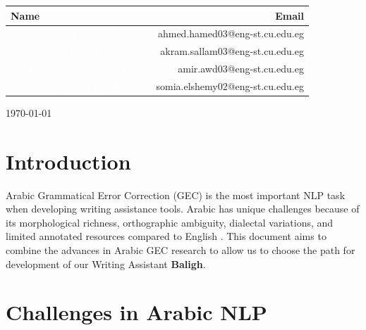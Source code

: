 \documentclass{article}
\begin{document}
\begin{titlepage}
\begin{center}
    \begin{tcolorbox}[mainbox, title=\textcolor{white}{Team Contact Information}, sharp corners=north, sharp corners=south]
        \renewcommand{\arraystretch}{1.2}
        \begin{tabularx}{\textwidth}{Xr}
            \textbf{\textcolor{accentgold}{Name}} & \textbf{\textcolor{accentgold}{Email}} \\
            \midrule
            \textcolor{white}{Ahmed Hamed Gaber Hamed} & \textcolor{secondarygrey}{ahmed.hamed03@eng-st.cu.edu.eg} \\
            \textcolor{white}{Akram Hany Karam Salam} & \textcolor{secondarygrey}{akram.sallam03@eng-st.cu.edu.eg} \\
            \textcolor{white}{Amir Anwar Bekhit Awd Kedis} & \textcolor{secondarygrey}{amir.awd03@eng-st.cu.edu.eg} \\
            \textcolor{white}{Somia Saad Ismail El-Shemy} & \textcolor{secondarygrey}{somia.elshemy02@eng-st.cu.edu.eg} \\
        \end{tabularx}
    \end{tcolorbox}
\end{center}

\begin{center}
    {\large \today \par}
\end{center}

    \vfill
\end{titlepage}

\newpage

\section{\textcolor{accentred}{Introduction}}
Arabic Grammatical Error Correction (GEC) is the most important NLP task when developing writing assistance tools. Arabic has unique challenges because of its morphological richness, orthographic ambiguity, dialectal variations, and limited annotated resources compared to English \cite{obeid2020camel, habash2010intro}. This document aims to combine the advances in Arabic GEC research to allow us to choose the path for development of our Writing Assistant \textbf{Baligh}.

\section{\textcolor{accentred}{Challenges in Arabic NLP}}
\end{document}
